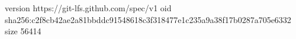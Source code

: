 version https://git-lfs.github.com/spec/v1
oid sha256:c2f8cb42ae2a81bbddc91548618c3f318477e1c235a9a38f17b0287a705e6332
size 56414

